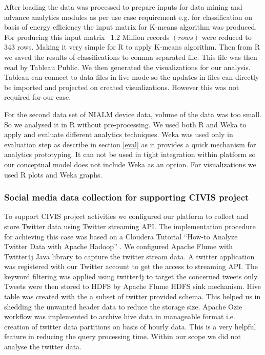  After loading the data was processed to prepare inputs for data mining and advance analytics modules as per use case requirement e.g. for classification on basis of energy efficiency the input matrix for K-means algorithm was produced. For producing this input matrix ~1.2 Million records \((rows)\) were reduced to 343 rows. Making it very simple for R to apply K-means algorithm. Then from R we saved the results of classifications to comma separated file. This file was then read by Tableau Public. We then generated the visualizations for our analysis. Tableau can connect to data files in live mode so the updates in files can directly be imported and projected on created visualizations. However this was not required for our case.
 
 For the second data set of NIALM device data, volume of the data was too small. So we analysed it in R without pre-processing. We used both R and Weka to apply and evaluate different analytics techniques. Weka was used only in evaluation step as describe in section \ref{eval} as it provides a quick mechanism for analytics prototyping. It can not be used in tight integration within platform so our conceptual model does not include Weka as an option. For visualizations we used R plots and Weka graphs.
 
 \subsubsection{Social media data collection for supporting CIVIS project}
 To support CIVIS project activities we configured our platform to collect and store Twitter data using Twitter streaming API. The implementation procedure for achieving this case was based on a Cloudera Tutorial ``How-to Analyze Twitter Data with Apache Hadoop'' \cite{clouderatwitter}.
 We configured Apache Flume with Twitter4j Java library to  capture the twitter stream data. A twitter application was registered with our Twitter account to get the access to streaming API. The keyword filtering was applied using twitter4j to target the concerned tweets only. Tweets were then stored to HDFS by Apache Flume HDFS sink mechanism. Hive table was created with the a subset of twitter provided schema. This helped us in shedding the unwanted header data to reduce the storage size. Apache Ozie workflow was implemented to archive hive data in manageable format i.e. creation of twitter data partitions on basis of hourly data. This is a very helpful feature in reducing the query processing time. Within our scope we did not analyse the twitter data.    
